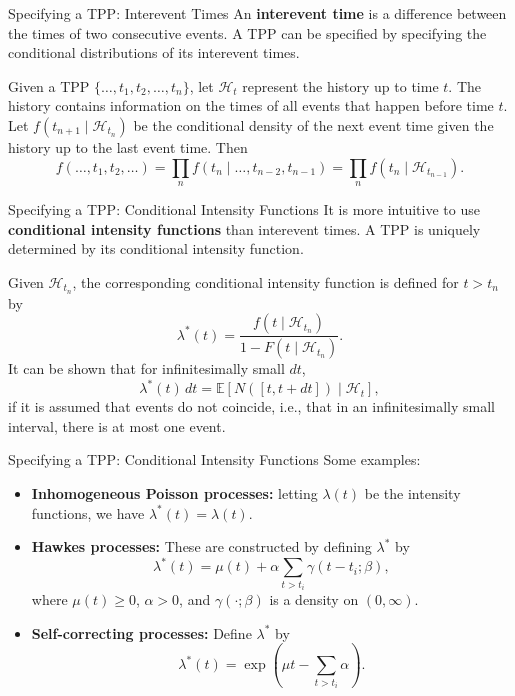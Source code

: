 \documentclass{beamer}
\def\E{\mathbb E}
\begin{document}
\begin{frame}{Specifying a TPP: Interevent Times}
    An \textbf{interevent time} is a difference between the times of two consecutive events. A TPP can be specified by specifying the conditional distributions of its interevent times.

    \medskip

    Given a TPP $\{\ldots, t_1, t_2, \ldots, t_n\}$, let $\mathcal{H}_t$ represent the history up to time $t$. The history contains information on the times of all events that happen before time $t$. Let $f(t_{n + 1} \mid \mathcal{H}_{t_n})$ be the conditional density of the next event time given the history up to the last event time. Then
    \[
    f(\ldots, t_1, t_2, \ldots)
    = \prod_n f(t_n \mid \ldots, t_{n - 2}, t_{n - 1})
    = \prod_n f(t_n \mid \mathcal{H}_{t_{n - 1}}).
    \]
\end{frame}

\begin{frame}{Specifying a TPP: Conditional Intensity Functions}
    It is more intuitive to use \textbf{conditional intensity functions} than interevent times. A TPP is uniquely determined by its conditional intensity function.

    \smallskip
    
    Given $\mathcal{H}_{t_n}$, the corresponding conditional intensity function is defined for $t > t_n$ by
    \[
    \lambda^*(t) = \frac{f(t \mid \mathcal{H}_{t_n})}{1 - F(t \mid \mathcal{H}_{t_n})}.
    \]
    It can be shown that for infinitesimally small $dt$,
    \[
    \lambda^*(t)\,dt = \E[N([t, t + dt]) \mid \mathcal{H}_t],
    \]
    if it is assumed that events do not coincide, i.e., that in an infinitesimally small interval, there is at most one event.
\end{frame}

\begin{frame}{Specifying a TPP: Conditional Intensity Functions}
    Some examples:
    \begin{itemize}
        \item \textbf{Inhomogeneous Poisson processes:} letting $\lambda(t)$ be the intensity functions, we have $\lambda^*(t) = \lambda(t)$.
        \item \textbf{Hawkes processes:} These are constructed by defining $\lambda^*$ by
        \[
        \lambda^*(t) = \mu(t) + \alpha\sum_{t > t_i} \gamma(t - t_i; \beta),
        \]
        where $\mu(t) \ge 0$, $\alpha > 0$, and $\gamma(\cdot; \beta)$ is a density on $(0, \infty)$.
        \item \textbf{Self-correcting processes:} Define $\lambda^*$ by
        \[
        \lambda^*(t) = \exp\left(\mu t - \sum_{t > t_i} \alpha\right).
        \]
    \end{itemize}
\end{frame}
\end{document}
